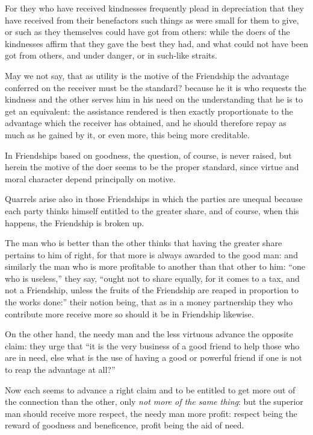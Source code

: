 For they who have received kindnesses frequently plead in depreciation that
they have received from their benefactors such things as were small for them to
give, or such as they themselves could have got from others: while the doers of
the kindnesses affirm that they gave the best they had, and what could not have
been got from others, and under danger, or in such-like straits.

May we not say, that as utility is the motive of the Friendship the advantage
conferred on the receiver must be the standard? because he it is who requests
the kindness and the other serves him in his need on the understanding that he
is to get an equivalent: the assistance rendered is then exactly proportionate
to the advantage which the receiver has obtained, and he should therefore repay
as much as he gained by it, or even more, this being more creditable.

In Friendships based on goodness, the question, of course, is never raised, but
herein the motive of the doer seems to be the proper standard, since virtue and
moral character depend principally on motive.


Quarrels arise also in those Friendships in which the parties are unequal
because each party thinks himself entitled to the greater share, and of course,
when this happens, the Friendship is broken up.

The man who is better than the other thinks that having the greater share
pertains to him of right, for that more is always awarded to the good man: and
similarly the man who is more profitable to another than that other to him:
“one who is useless,” they say, “ought not to share equally,
for it comes to a tax, and not a Friendship, unless the fruits of the
Friendship are reaped in proportion to the works done:” their notion
being, that as in a money partnership they who contribute more receive more so
should it be in Friendship likewise.

On the other hand, the needy man and the less virtuous advance the opposite
claim: they urge that “it is the very business of a good friend to help
those who are in need, else what is the use of having a good or powerful friend
if one is not to reap the advantage at all?”

Now each seems to advance a right claim and to be entitled to get more out of
the connection than the other, only \emph{not more of the same thing}: but the
superior man should receive more respect, the needy man more profit: respect
being the reward of goodness and beneficence, profit being the aid of need.

